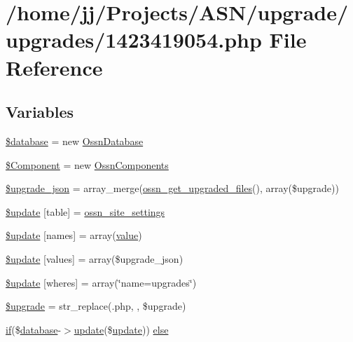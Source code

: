 \hypertarget{1423419054_8php}{}\section{/home/jj/\+Projects/\+A\+S\+N/upgrade/upgrades/1423419054.php File Reference}
\label{1423419054_8php}
\subsection*{Variables}
\begin{DoxyCompactItemize}
\item 
\hyperlink{1423419054_8php_a7691c0162d89de0b6ba47edcd8ba8878}{\$database} = new \hyperlink{class_ossn_database}{Ossn\+Database}
\item 
\hyperlink{1423419054_8php_a02ea7567c10bfaae8b945a600a9f2de1}{\$\+Component} = new \hyperlink{class_ossn_components}{Ossn\+Components}
\item 
\hyperlink{1423419054_8php_a512525d0f5eb608ac72ca7b85e5fbf65}{\$upgrade\+\_\+json} = array\+\_\+merge(\hyperlink{ossn_8lib_8upgrade_8php_a984d0f1ee4273d739939d28d00a8bedb}{ossn\+\_\+get\+\_\+upgraded\+\_\+files}(), array(\$upgrade))
\item 
\hyperlink{1423419054_8php_aee7ba5985ddf023a93862ab77e9718f9}{\$update} \mbox{[}\textquotesingle{}table\textquotesingle{}\mbox{]} = \textquotesingle{}\hyperlink{ossn_8lib_8system_8php_a610e2045b8a86c09f777b4d82e24e34c}{ossn\+\_\+site\+\_\+settings}\textquotesingle{}
\item 
\hyperlink{1423419054_8php_abcf5ad2e4fef35de04bef0168cc91ddc}{\$update} \mbox{[}\textquotesingle{}names\textquotesingle{}\mbox{]} = array(\textquotesingle{}\hyperlink{fullpage_2plugin_8min_8js_ac56c57897e10f699d124e0103921aa20}{value}\textquotesingle{})
\item 
\hyperlink{1423419054_8php_ac82a75b4c6df37380ff77c88f041785e}{\$update} \mbox{[}\textquotesingle{}values\textquotesingle{}\mbox{]} = array(\$upgrade\+\_\+json)
\item 
\hyperlink{1423419054_8php_aacde4479a904b32d0f24dea4e01f148c}{\$update} \mbox{[}\textquotesingle{}wheres\textquotesingle{}\mbox{]} = array(\char`\"{}name=\textquotesingle{}upgrades\textquotesingle{}\char`\"{})
\item 
\hyperlink{1423419054_8php_a9084097ce600d3cc7a79a20ecaea9906}{\$upgrade} = str\+\_\+replace(\textquotesingle{}.php\textquotesingle{}, \textquotesingle{}\textquotesingle{}, \$upgrade)
\item 
\hyperlink{jquery_8tokeninput_8js_ad8dd46a3cbc004569e34401e9e71771a}{if}(\$\hyperlink{ossn_8config_8db_8example_8php_a4e0ca996705612048240f76ff8d4da95}{database}-\/$>$\hyperlink{_chart_8_doughnut_8js_ad58a8121caa8678969d1ff32848a77c4}{update}(\$\hyperlink{_chart_8_doughnut_8js_ad58a8121caa8678969d1ff32848a77c4}{update})) \hyperlink{1423419054_8php_aa7c58ee9f19ec0c0f3a1951839273e79}{else}
\end{DoxyCompactItemize}


